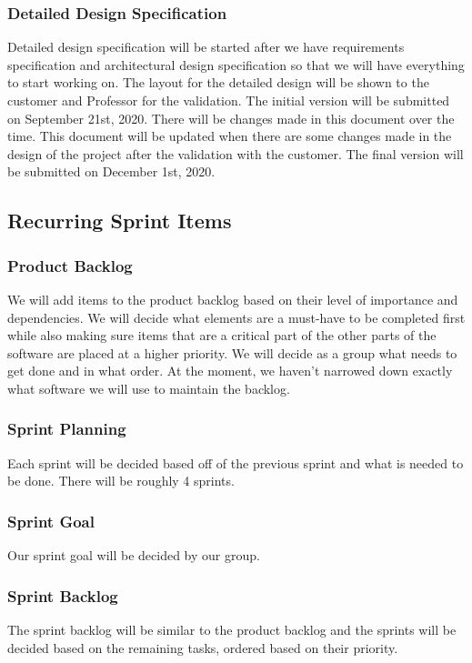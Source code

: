 \subsubsection{Detailed Design Specification}
Detailed design specification will be started after we have requirements specification and architectural design specification so that we will have everything to start working on. The layout for the detailed design will be shown to the customer and Professor for the validation. The initial version will be submitted on September 21st, 2020. There will be changes made in this document over the time. This document will be updated when there are some changes made in the design of the project after the validation with the customer. The final version will be submitted on December 1st, 2020.




\subsection{Recurring Sprint Items}
\subsubsection{Product Backlog}
We will add items to the product backlog based on their level of importance and dependencies. We will
decide what elements are a must-have to be completed first while also making sure items that are a
critical part of the other parts of the software are placed at a higher priority. We will decide as a group
what needs to get done and in what order. At the moment, we haven't narrowed down exactly what
software we will use to maintain the backlog.
\subsubsection{Sprint Planning}
Each sprint will be decided based off of the previous sprint and what is needed to be done. There will be roughly 4 sprints.

\subsubsection{Sprint Goal}
Our sprint goal will be decided by our group.
\subsubsection{Sprint Backlog}
The sprint backlog will be similar to the product backlog and the sprints will be decided based on the remaining tasks,
ordered based on their priority.
